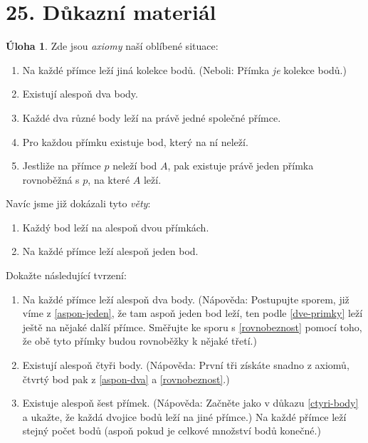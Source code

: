 \documentclass[9pt,a5paper]{extarticle}
\makeatletter
\newcommand{\hint}[1]{{\color{gray}\footnotesize\noindent(Nápověda: #1)}}
\def\tisk{%
\newbox\shipouthackbox
\pdfpagewidth=2\pdfpagewidth
\let\oldshipout=\shipout
\def\shipout{\afterassignment\zdvojtmp \setbox\shipouthackbox=}%
\def\zdvojtmp{\aftergroup\zdvoj}%
\def\zdvoj{%
    \oldshipout\vbox{\hbox{%
        \copy\shipouthackbox
        \hskip\dimexpr .5\pdfpagewidth-\wd\shipouthackbox\relax
        \box\shipouthackbox
    }}%
}}%
\let\results\newpage
\let\endresults\relax
\def\resultssame{%
    \long\def\results##1\endresults{%
        \vfill
        \noindent\rotatebox{180}{\vbox{##1}}%
    }%
}
\theoremstyle{definition}
\newtheorem{uloha}{\atr Úloha}
\def\ststitem{\@noitemargtrue\@item[$\star\star$ \@itemlabel]}
\def\atr{}
\makeatother
\begin{document}

\section*{25. Důkazní materiál}


\begin{uloha} %
Zde jsou \emph{axiomy} naší oblíbené  situace:
\begin{enumerate}[label={(A\arabic*)}]
    \item Na každé přímce leží jiná kolekce bodů. (Neboli: Přímka \emph{je} kolekce bodů.)
    \item Existují alespoň dva body.
    \item Každé dva různé body leží na právě jedné společné přímce.
    \item Pro každou přímku existuje bod, který na ní neleží.
    \item Jestliže na přímce $p$ neleží bod $A$, pak existuje právě jeden přímka rovnoběžná s $p$, na které $A$ leží.\label{rovnobeznost}
\end{enumerate}
Navíc jsme již dokázali tyto \emph{věty}:
\begin{enumerate}[label={(V\arabic*)}]
    \item Každý bod leží na alespoň dvou přímkách.\label{dve-primky}
    \item Na každé přímce leží alespoň jeden bod.\label{aspon-jeden}
\end{enumerate}
Dokažte následující tvrzení:
\begin{enumerate}[resume,label={(V\arabic*)}]
    \item Na každé přímce leží alespoň dva body. \hint{Postupujte sporem, již víme z \ref{aspon-jeden}, že tam aspoň jeden bod leží, ten podle \ref{dve-primky} leží ještě na nějaké další přímce. Směřujte ke sporu s \ref{rovnobeznost} pomocí toho, že obě tyto přímky budou rovnoběžky k nějaké třetí.} \label{aspon-dva}
    \item Existují alespoň čtyři body. \hint{První tři získáte snadno z axiomů, čtvrtý bod pak z \ref{aspon-dva} a \ref{rovnobeznost}.}\label{ctyri-body}
    \item Existuje alespoň šest přímek. \hint{Začněte jako v důkazu \ref{ctyri-body} a ukažte, že každá dvojice bodů leží na jiné přímce.}
    \ststitem Na každé přímce leží stejný počet bodů (aspoň pokud je celkové množství bodů konečné.)
\end{enumerate}
\end{uloha}
\end{document}
